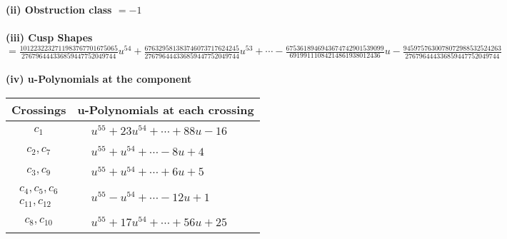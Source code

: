 \documentclass[1p]{elsarticle_modified}
\theoremstyle{definition}
\begin{document}
\flushleft \textbf{(ii) Obstruction class $= -1$}\\~\\
\flushleft \textbf{(iii) Cusp Shapes $= \frac{1012232232711983767701675065}{276796444336859447752049744} u^{54}+\frac{676329581383746073717624245}{276796444336859447752049744} u^{53}+\cdots-\frac{6753618946943674742901539099}{69199111084214861938012436} u-\frac{9459757630078072988532524263}{276796444336859447752049744}$}\\~\\
\newpage\renewcommand{\arraystretch}{1}
\flushleft \textbf{(iv) u-Polynomials at the component}\newline \\
\begin{tabular}{m{50pt}|m{274pt}}
Crossings & \hspace{64pt}u-Polynomials at each crossing \\
\hline $$\begin{aligned}c_{1}\end{aligned}$$&$\begin{aligned}
&u^{55}+23 u^{54}+\cdots+88 u-16
\end{aligned}$\\
\hline $$\begin{aligned}c_{2},c_{7}\end{aligned}$$&$\begin{aligned}
&u^{55}+u^{54}+\cdots-8 u+4
\end{aligned}$\\
\hline $$\begin{aligned}c_{3},c_{9}\end{aligned}$$&$\begin{aligned}
&u^{55}+u^{54}+\cdots+6 u+5
\end{aligned}$\\
\hline $$\begin{aligned}c_{4},c_{5},c_{6}\\c_{11},c_{12}\end{aligned}$$&$\begin{aligned}
&u^{55}- u^{54}+\cdots-12 u+1
\end{aligned}$\\
\hline $$\begin{aligned}c_{8},c_{10}\end{aligned}$$&$\begin{aligned}
&u^{55}+17 u^{54}+\cdots+56 u+25
\end{aligned}$\\
\hline
\end{tabular}\\~\\
\end{document}
